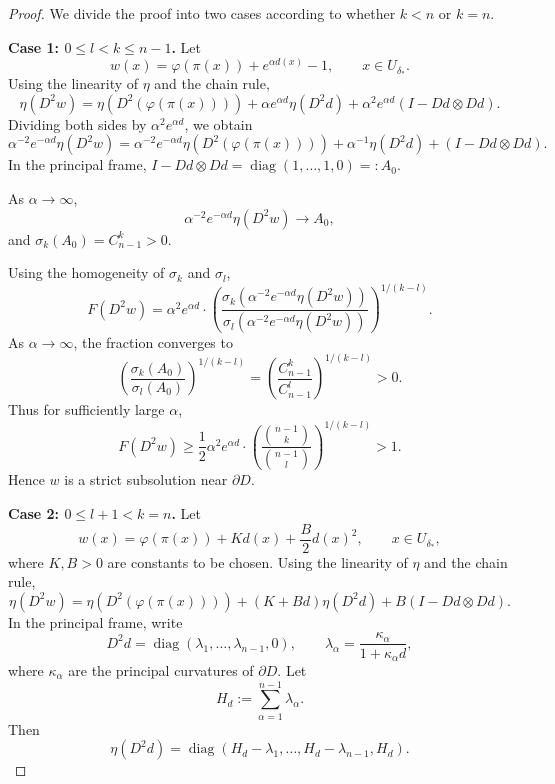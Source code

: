 \documentclass[reqno,a4paper]{amsart}
\numberwithin{equation}{section}
\begin{document}
	\begin{proof}
		We divide the proof into two cases according to whether $k < n$ or $k = n$.
		
		\medskip
		\noindent\textbf{Case 1: $0 \le l < k \le n-1$.} 
		Let
		\[
		w(x) = \varphi(\pi(x)) + e^{\alpha d(x)} - 1, \qquad x \in U_{\delta_*}.
		\]
		Using the linearity of $\eta$ and the chain rule,
		\[
		\eta(D^2 w) = \eta(D^2(\varphi(\pi(x)))) + \alpha e^{\alpha d} \eta(D^2 d) + \alpha^2 e^{\alpha d} (I - Dd \otimes Dd).
		\]
		Dividing both sides by $\alpha^2 e^{\alpha d}$, we obtain
		\[
		\alpha^{-2} e^{-\alpha d} \eta(D^2 w)
		= \alpha^{-2} e^{-\alpha d} \eta(D^2(\varphi(\pi(x))))
		+ \alpha^{-1} \eta(D^2 d)
		+ (I - Dd \otimes Dd).
		\]
		In the principal frame, $I - Dd \otimes Dd = \operatorname{diag}(1,\dots,1,0) =: A_0$.
		
		As $\alpha \to \infty$,
		\[
		\alpha^{-2} e^{-\alpha d} \eta(D^2 w) \to A_0,
		\]
		and $\sigma_k(A_0) = C_{n-1}^{k}> 0$.
		
		Using the homogeneity of $\sigma_k$ and $\sigma_l$,
		\[
		F(D^2 w) = \alpha^2 e^{\alpha d} \cdot \left( \frac{\sigma_k(\alpha^{-2} e^{-\alpha d} \eta(D^2 w))}{\sigma_l(\alpha^{-2} e^{-\alpha d} \eta(D^2 w))} \right)^{1/(k-l)}.
		\]
		As $\alpha \to \infty$, the fraction converges to
		\[
		\left( \frac{\sigma_k(A_0)}{\sigma_l(A_0)} \right)^{1/(k-l)} = 
		\left( \frac{C_{n-1}^{k}}{C_{n-1}^{l}} \right)^{1/(k-l)} > 0.
		\]
		Thus for sufficiently large $\alpha$,
		\[
		F(D^2 w) \ge \frac12 \alpha^2 e^{\alpha d} \cdot \left( \frac{\binom{n-1}{k}}{\binom{n-1}{l}} \right)^{1/(k-l)} > 1.
		\]
		Hence $w$ is a strict subsolution near $\partial D$.
		
		\medskip
		\noindent\textbf{Case 2: $0\leq l+1<k = n$.} 
		Let
		\[
		w(x) = \varphi(\pi(x)) + K d(x) + \frac{B}{2} d(x)^2, \qquad x \in U_{\delta_*},
		\]
		where $K, B > 0$ are constants to be chosen. Using the linearity of $\eta$ and the chain rule,
		\[
		\eta(D^2 w) = \eta(D^2(\varphi(\pi(x)))) + (K + B d) \eta(D^2 d) + B (I - Dd \otimes Dd). 
		\]
		In the principal frame, write
		\begin{equation}
			D^2 d = \operatorname{diag}(\lambda_1, \dots, \lambda_{n-1}, 0), \qquad
			\lambda_\alpha = \frac{\kappa_\alpha}{1 + \kappa_\alpha d},
		\end{equation}
		where $\kappa_\alpha$ are the principal curvatures of $\partial D$. Let
		\[
		H_d := \sum_{\alpha=1}^{n-1} \lambda_\alpha.
		\]
		Then
		\[
		\eta(D^2 d) = \operatorname{diag}(H_d - \lambda_1, \dots, H_d - \lambda_{n-1}, H_d).
		\]
		

\end{proof}
\end{document}
